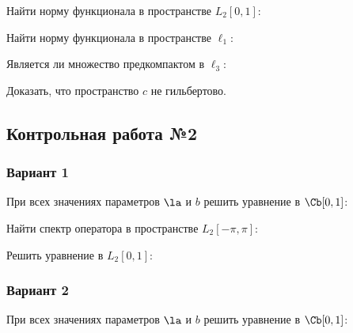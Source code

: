 \documentclass[a4paper]{article}
\begin{document}
\begin{problem}
Найти норму функционала в пространстве $L_2[0,1]$:
\end{problem}

\begin{problem}
Найти норму функционала в пространстве $\ell_1$:
\end{problem}

\begin{problem}
Является ли множество предкомпактом в $\ell_3$:
\end{problem}

\begin{problem}
Доказать, что пространство $c$ не гильбертово.
\end{problem}

\subsection{Контрольная работа №2}

\subsubsection{Вариант 1}
\setcounter{problem}{0}
\begin{problem}
При всех значениях параметров $\la$ и $b$ решить уравнение в $\Cb[0,1]$:
\end{problem}
\begin{problem}
Найти спектр оператора в пространстве $L_2[-\pi,\pi]$:
\end{problem}
\begin{problem}
Решить уравнение в $L_2[0,1]$:
\end{problem}

\subsubsection{Вариант 2}
\setcounter{problem}{0}
\label{fa.second}
\begin{problem}
При всех значениях параметров $\la$ и $b$ решить уравнение в $\Cb[0,1]$:
\end{problem}
\begin{answer}
\end{answer}
\end{document}
